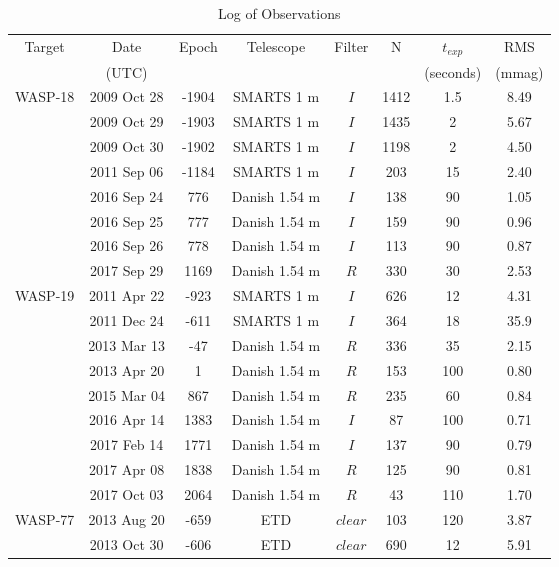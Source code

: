 \begin{table*}
\caption{Log of Observations}             
\label{log_table}      
\centering          
\begin{tabular}{cccccccc}
\hline\hline       
Target & Date & Epoch\footnotemark{a} & Telescope & Filter & N & $t_{exp}$\footnotemark{b} & RMS\footnotemark{c} \\
& (UTC) &       &           &       &                   & (seconds) & (mmag)\\
\hline  
WASP-18 & 2009 Oct 28 &-1904 & SMARTS 1 m & $I$ & 1412 & 1.5 & 8.49  \\
 				& 2009 Oct 29 & -1903 & SMARTS 1 m & $I$ & 1435 & 2 & 5.67 \\
				& 2009 Oct 30 & -1902 & SMARTS 1 m & $I$ & 1198 & 2  & 4.50 \\
 				& 2011 Sep 06 & -1184 & SMARTS 1 m & $I$ & 203 & 15 & 2.40 \\
				& 2016 Sep 24\footnotemark{d} & 776 & Danish 1.54 m & $I$ & 138 & 90 & 1.05  \\
				& 2016 Sep 25\footnotemark{d} & 777 &Danish 1.54 m & $I$ & 159 & 90  & 0.96  \\
			    & 2016 Sep 26\footnotemark{d} & 778 & Danish 1.54 m & $I$ & 113 & 90 & 0.87  \\ \smallskip
				& 2017 Sep 29\footnotemark{d} & 1169 & Danish 1.54 m & $R$ & 330 & 30 & 2.53 \\
WASP-19 & 2011 Apr 22 & -923 & SMARTS 1 m &   $I$ &  626  & 12  & 4.31   \\
     & 2011 Dec 24 & -611 & SMARTS 1 m &   $I$ & 364  & 18  & 35.9 \\
     & 2013 Mar 13 & -47 & Danish 1.54 m & $R$ & 336 & 35 & 2.15\\
     & 2013 Apr 20 & 1 & Danish 1.54 m & $R$ & 153 & 100 & 0.80 \\
     & 2015 Mar 04 & 867 & Danish 1.54 m & $R$ & 235 & 60 & 0.84\\
     & 2016 Apr 14 & 1383 & Danish 1.54 m & $I$ & 87 & 100 & 0.71\\
     & 2017 Feb 14 & 1771 & Danish 1.54 m & $I$ & 137 & 90 & 0.79\\
     & 2017 Apr 08 & 1838 & Danish 1.54 m & $R$ & 125 & 90 & 0.81\\\smallskip
     & 2017 Oct 03 & 2064 & Danish 1.54 m & $R$ & 43 & 110 & 1.70\\ 
 WASP-77 & 2013 Aug 20 & -659 & ETD\footnotemark{e} & $clear$ & 103 & 120 & 3.87  \\
    & 2013 Oct 30 & -606 & ETD\footnotemark{e} & $clear$ & 690 & 12 & 5.91 \\

\end{tabular}
\end{table*}
